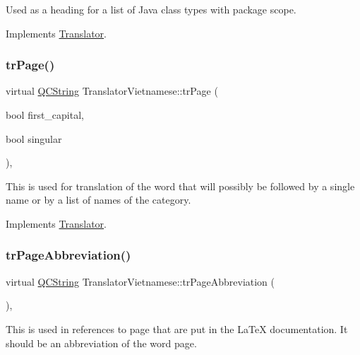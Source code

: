 Used as a heading for a list of Java class types with package scope. 

Implements \mbox{\hyperlink{class_translator}{Translator}}.

\mbox{\label{class_translator_vietnamese_a7215933b3fe84fc0f219d33c43dc91a1}} 
\subsubsection{\texorpdfstring{trPage()}{trPage()}}
{\footnotesize\ttfamily virtual \mbox{\hyperlink{class_q_c_string}{Q\+C\+String}} Translator\+Vietnamese\+::tr\+Page (\begin{DoxyParamCaption}\item[{bool}]{first\+\_\+capital,  }\item[{bool}]{singular }\end{DoxyParamCaption})\hspace{0.3cm}{\ttfamily [inline]}, {\ttfamily [virtual]}}

This is used for translation of the word that will possibly be followed by a single name or by a list of names of the category. 

Implements \mbox{\hyperlink{class_translator}{Translator}}.

\mbox{\label{class_translator_vietnamese_afc76d699c489e9be24dc1427236bff02}} 
\subsubsection{\texorpdfstring{trPageAbbreviation()}{trPageAbbreviation()}}
{\footnotesize\ttfamily virtual \mbox{\hyperlink{class_q_c_string}{Q\+C\+String}} Translator\+Vietnamese\+::tr\+Page\+Abbreviation (\begin{DoxyParamCaption}{ }\end{DoxyParamCaption})\hspace{0.3cm}{\ttfamily [inline]}, {\ttfamily [virtual]}}

This is used in references to page that are put in the La\+TeX documentation. It should be an abbreviation of the word page. 

